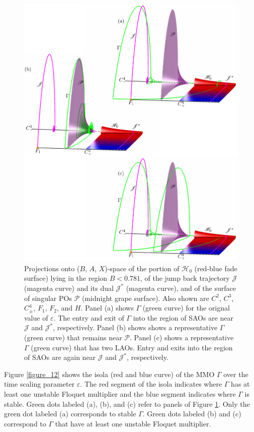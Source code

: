 \documentclass{ws-ijbc}
\begin{document}
\begin{figure}[H]
\centering
\includegraphics[]{./figures/MKMO_14.pdf}
\caption{Projections onto ($B$, $A$, $X$)-space of the portion of $\mathscr{H}_0$ (red-blue fade surface) lying in the region $B<0.781$, of the jump back trajectory $\mathscr{J}$ (magenta curve) and its dual $\mathscr{J}^*$ (magenta curve), and of the surface of singular POs $\mathscr{P}$ (midnight grape surface).  Also shown are $C^2$, $C^3$, $C^4_\pm$, $F_1$, $F_2$, and $H$.  Panel (a) shows $\Gamma$ (green curve) for the orignal value of $\varepsilon$.  The entry and exit of $\Gamma$ into the region of SAOs are near $\mathscr{J}$ and $\mathscr{J}^*$, respectively.  Panel (b) shows shows a representative $\Gamma$ (green curve) that remains near $\mathscr{P}$.  Panel (c) shows a representative $\Gamma$ (green curve) that has two LAOs.  Entry and exits into the region of SAOs are again near $\mathscr{J}$ and $\mathscr{J}^*$, respectively.}
\label{figure_14}
\end{figure}


Figure \ref{figure_12} shows the isola (red and blue curve) of the MMO $\Gamma$ over the time scaling parameter $\varepsilon$.  The red segment of the isola indicates where $\Gamma$ has at least one unstable Floquet multiplier and the blue segment indicates where $\Gamma$ is stable.  Green dots labeled (a), (b), and (c) refer to panels of Figure \ref{figure_14}.  Only the green dot labeled (a) corresponds to stable $\Gamma$.  Green dots labeled (b) and (c) correspond to $\Gamma$ that have at least one unstable Floquet multiplier.
\end{document}
